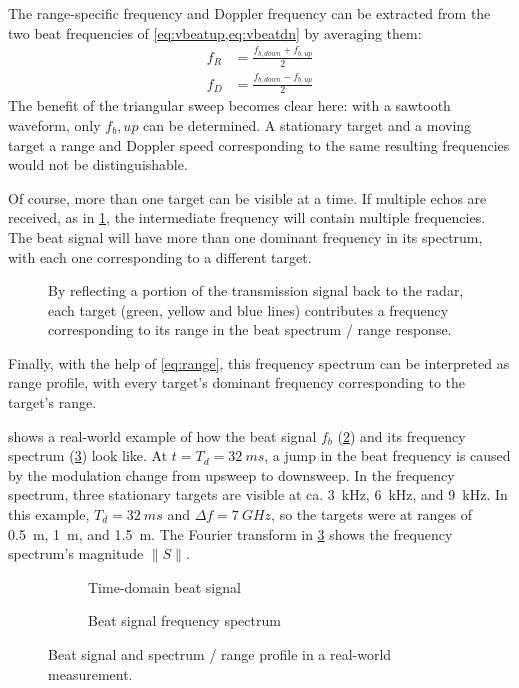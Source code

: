 The range-specific frequency and Doppler frequency can be extracted from the two beat frequencies of \cref{eq:vbeatup,eq:vbeatdn} by averaging them: 
\begin{align}
	f_R &= \frac{f_{b,down} + f_{b,up}}{2} \\
    f_D &= \frac{f_{b,down} - f_{b,up}}{2}
\end{align}
The benefit of the triangular sweep becomes clear here: with a sawtooth
waveform, only \(f_b,up\) can be determined. A stationary target and a
moving target a range and Doppler speed corresponding to the same
resulting frequencies would not be distinguishable.

Of course, more than one target can be visible at a time. If multiple
echos are received, as in \cref{fig:fmcw_multitarget}, the intermediate frequency will
contain multiple frequencies. The beat signal will have more than one
dominant frequency in its spectrum, with each one corresponding to a
different target.

\begin{figure}[htbp]
    \centering
    \def\svgwidth{10cm}
    
    \caption{By reflecting a portion of the transmission signal back to the radar, each target (green, yellow and blue lines) contributes a frequency corresponding to its range in the beat spectrum / range response.}
    \label{fig:fmcw_multitarget}
\end{figure}

Finally, with the help of \cref{eq:range}, this frequency spectrum can be interpreted as range profile, with every target's dominant frequency corresponding to the target's range.

 shows a real-world example of how the beat signal \(f_b\)
(\cref{fig:rawbeat_t}) and its frequency spectrum (\cref{fig:rawbeat_f}) look like. At
\(t=T_d=\SI{32}{ms}\), a jump in the beat frequency is caused by the modulation
change from upsweep to downsweep. In the frequency spectrum, three
stationary targets are visible at ca. \SI{3}{kHz}, \SI{6}{kHz}, and \SI{9}{kHz}.
In this example, \(T_d=\SI{32}{ms}\) and \(\Delta f=\SI{7}{GHz}\), so the targets were
at ranges of \SI{0.5}{m}, \SI{1}{m}, and \SI{1.5}{m}. The Fourier transform
in \cref{fig:rawbeat_f} shows the frequency spectrum's magnitude \(\|S\|\).

\begin{figure}[htbp]
    \begin{subfigure}[t]{0.475\textwidth}
        \centering
        \def\svgwidth{\linewidth} \small
        
        \caption{\label{fig:rawbeat_t}Time-domain beat signal}
    \end{subfigure}%
    \hfill%
    \begin{subfigure}[t]{0.475\textwidth}
        \centering
        \def\svgwidth{\linewidth} \small
        
        \caption{\label{fig:rawbeat_f}Beat signal frequency spectrum}
    \end{subfigure}
    \caption{\label{fig:fig_raw_beat}Beat signal and spectrum / range profile in a real-world measurement.}
\end{figure}

